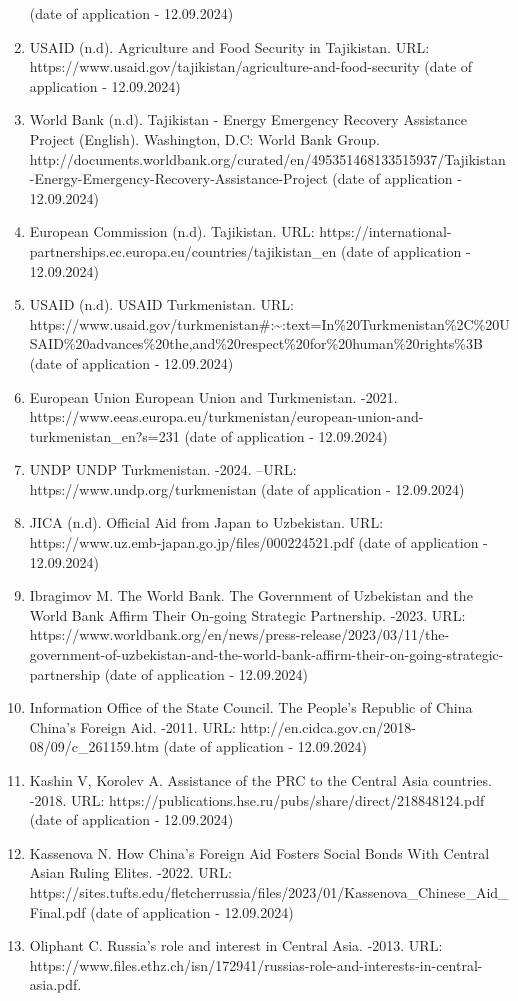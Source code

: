 \begin{enumerate}
  (date of application - 12.09.2024)
\item
  USAID (n.d). Agriculture and Food Security in Tajikistan. URL:
  https://www.usaid.gov/tajikistan/agriculture-and-food-security (date
  of application - 12.09.2024)
\item
  World Bank (n.d). Tajikistan - Energy Emergency Recovery Assistance
  Project (English). Washington, D.C: World Bank Group.
  http://documents.worldbank.org/curated/en/495351468133515937/Tajikistan-Energy-Emergency-Recovery-Assistance-Project
  (date of application - 12.09.2024)
\item
  European Commission (n.d). Tajikistan. URL:
  https://international-partnerships.ec.europa.eu/countries/tajikistan\_en
  (date of application - 12.09.2024)
\item
  USAID (n.d). USAID Turkmenistan. URL:
  https://www.usaid.gov/turkmenistan\#:\textasciitilde:text=In\%20Turkmenistan\%2C\%20USAID\%20advances\%20the,and\%20respect\%20for\%20human\%20rights\%3B
  (date of application - 12.09.2024)
\item
  European Union European Union and Turkmenistan. -2021.
  https://www.eeas.europa.eu/turkmenistan/european-union-and-turkmenistan\_en?s=231
  (date of application - 12.09.2024)
\item
  UNDP UNDP Turkmenistan. -2024. --URL:
  https://www.undp.org/turkmenistan (date of application - 12.09.2024)
\item
  JICA (n.d). Official Aid from Japan to Uzbekistan. URL:
  https://www.uz.emb-japan.go.jp/files/000224521.pdf (date of
  application - 12.09.2024)
\item
  Ibragimov M. The World Bank. The Government of Uzbekistan and the
  World Bank Affirm Their On-going Strategic Partnership. -2023. URL:
  https://www.worldbank.org/en/news/press-release/2023/03/11/the-government-of-uzbekistan-and-the-world-bank-affirm-their-on-going-strategic-partnership
  (date of application - 12.09.2024)
\item
  Information Office of the State Council. The People's Republic of
  China China's Foreign Aid. -2011. URL:
  http://en.cidca.gov.cn/2018-08/09/c\_261159.htm (date of application -
  12.09.2024)
\item
  Kashin V, Korolev A. Assistance of the PRC to the Central Asia
  countries. -2018. URL:
  https://publications.hse.ru/pubs/share/direct/218848124.pdf (date of
  application - 12.09.2024)
\item
  Kassenova N. How China's Foreign Aid Fosters Social Bonds With Central
  Asian Ruling Elites. -2022. URL:
  https://sites.tufts.edu/fletcherrussia/files/2023/01/Kassenova\_Chinese\_Aid\_Final.pdf
  (date of application - 12.09.2024)
\item
  Oliphant C. Russia's role and interest in Central Asia. -2013. URL:
  https://www.files.ethz.ch/isn/172941/russias-role-and-interests-in-central-asia.pdf.
\end{enumerate}

